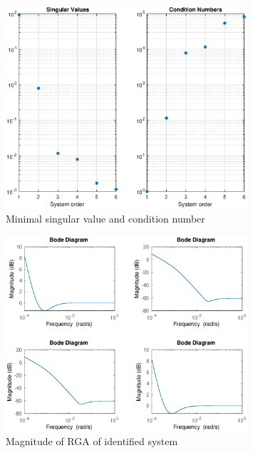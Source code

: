 \documentclass[12pt]{article}
\begin{document}
\begin{figure}
\centering
\includegraphics[width=0.8\textwidth]{../Systemanalyse/Log_Data_to_Matlab/Figurer/Identifisering/d-sr_info.eps}
\caption{Minimal singular value and condition number}
\label{fig:d-sr_info}
\end{figure}

\begin{figure}
\centering
\includegraphics[width=0.8\textwidth]{../Systemanalyse/Log_Data_to_Matlab/Figurer/Identifisering/BD_RGA.eps}
\caption{Magnitude of RGA of identified system}
\label{fig:BD_RGA}
\end{figure}
\end{document}
